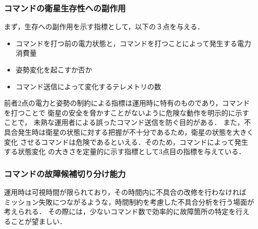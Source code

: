 \documentclass[11pt]{jsarticle}%
\begin{document}
\begin{multicols}{2}
  \subsubsection{コマンドの衛星生存性への副作用}
  まず，生存への副作用を示す指標として，以下の３点を与える．
\vspace{-1zh}
\begin{itemize}
    \item コマンドを打つ前の電力状態と，コマンドを打つことによって発生する電力消費量
    \item 姿勢変化を起こすか否か
    \item コマンド送信によって変化するテレメトリの数
  \end{itemize}
  前者2点の電力と姿勢の制約による指標は運用時に特有のものであり，コマンドを打つことで
  衛星の安全を脅かすことがないように危険な動作を明示的に示すことで，
  未熟な運用者による誤ったコマンド送信を防ぐ目的がある．
  また，不具合発生時は衛星の状態に対する把握が不十分であるため，衛星の状態を大きく変化
  させるコマンドは危険であるといえる．そのため，コマンドによって発生する状態変化
  の大きさを定量的に示す指標として3点目の指標を与えている．
\vspace{-1zh}
\subsubsection{コマンドの故障候補切り分け能力}
  運用時は可視時間が限られており，その時間内に不具合の改修を行わなければ
  ミッション失敗につながるような，時間制約を考慮した不具合分析を行う場面が考えられる．
  その際には，少ないコマンド数で効率的に故障箇所の特定を行えることが望ましい．


\end{multicols}
\end{document}
